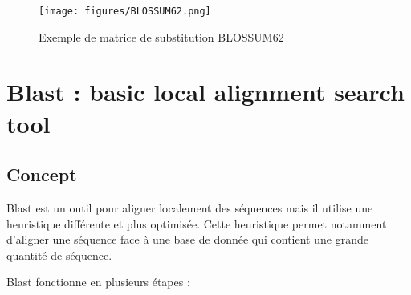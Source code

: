 \documentclass{article}
\begin{document}
\begin{figure}[H]
  \centering
      \texttt{[image: figures/BLOSSUM62.png]}
  \caption{Exemple de matrice de substitution BLOSSUM62}
\end{figure}

\newpage

\section{Blast : basic local alignment search tool}
\subsection{Concept}
    
Blast est un outil pour aligner localement des séquences mais il utilise une heuristique différente et plus optimisée. Cette heuristique permet notamment d'aligner une séquence face à une base de donnée qui contient une grande quantité de séquence.

Blast fonctionne en plusieurs étapes :
\end{document}

